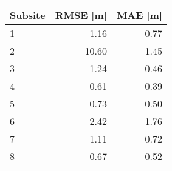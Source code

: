 \begin{tabular}{lrr}
\toprule

Subsite & RMSE [m] & MAE [m] \\
\midrule
1 & 1.16 & 0.77 \\
2 & 10.60 & 1.45 \\
3 & 1.24 & 0.46 \\
4 & 0.61 & 0.39 \\
5 & 0.73 & 0.50 \\
6 & 2.42 & 1.76 \\
7 & 1.11 & 0.72 \\
8 & 0.67 & 0.52 \\
\bottomrule
\end{tabular}
